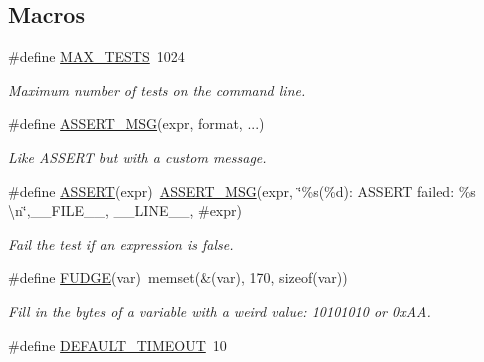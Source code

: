 \subsection*{Macros}
\begin{DoxyCompactItemize}
\item 
\mbox{\label{group__Testing_ga2a77d2f2c5b698c69c19e1f8782bf709}} 
\#define \hyperlink{group__Testing_ga2a77d2f2c5b698c69c19e1f8782bf709}{M\+A\+X\+\_\+\+T\+E\+S\+TS}~1024
\begin{DoxyCompactList}\small\item\em Maximum number of tests on the command line. \end{DoxyCompactList}\item 
\#define \hyperlink{group__Testing_ga9be407f8744aff436633d34c62591cb9}{A\+S\+S\+E\+R\+T\+\_\+\+M\+SG}(expr,  format, ...)
\begin{DoxyCompactList}\small\item\em Like A\+S\+S\+E\+RT but with a custom message. \end{DoxyCompactList}\item 
\#define \hyperlink{group__Testing_ga28301f76c53b643912da7c538f74e2c6}{A\+S\+S\+E\+RT}(expr)~\hyperlink{group__Testing_ga9be407f8744aff436633d34c62591cb9}{A\+S\+S\+E\+R\+T\+\_\+\+M\+SG}(expr, \char`\"{}\%s(\%d)\+: A\+S\+S\+E\+RT failed\+: \%s \textbackslash{}n\char`\"{},\+\_\+\+\_\+\+F\+I\+L\+E\+\_\+\+\_\+, \+\_\+\+\_\+\+L\+I\+N\+E\+\_\+\+\_\+, \#expr)
\begin{DoxyCompactList}\small\item\em Fail the test if an expression is false. \end{DoxyCompactList}\item 
\mbox{\label{group__Testing_ga1ac76218e138d4f495b9a695c5da5b9b}} 
\#define \hyperlink{group__Testing_ga1ac76218e138d4f495b9a695c5da5b9b}{F\+U\+D\+GE}(var)~memset(\&(var), 170, sizeof(var))
\begin{DoxyCompactList}\small\item\em Fill in the bytes of a variable with a weird value\+: 10101010 or 0x\+AA. \end{DoxyCompactList}\item 
\mbox{\label{group__Testing_gaad2dd72565852b91c809cd4685833b17}} 
\#define \hyperlink{group__Testing_gaad2dd72565852b91c809cd4685833b17}{D\+E\+F\+A\+U\+L\+T\+\_\+\+T\+I\+M\+E\+O\+UT}~10

\end{DoxyCompactItemize}
